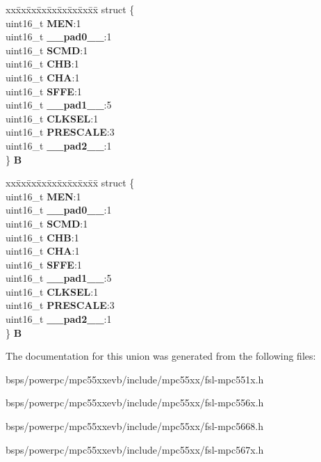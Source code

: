\begin{DoxyCompactItemize}
\begin{tabbing}
\end{tabbing}\item 
\mbox{\label{unionuMCR_a4d56113aeff75e361d6a373b9f5584f4}} 
\begin{tabbing}
xx\=xx\=xx\=xx\=xx\=xx\=xx\=xx\=xx\=\kill
struct \{\\
\>uint16\_t {\bfseries MEN}:1\\
\>uint16\_t {\bfseries \_\_pad0\_\_}:1\\
\>uint16\_t {\bfseries SCMD}:1\\
\>uint16\_t {\bfseries CHB}:1\\
\>uint16\_t {\bfseries CHA}:1\\
\>uint16\_t {\bfseries SFFE}:1\\
\>uint16\_t {\bfseries \_\_pad1\_\_}:5\\
\>uint16\_t {\bfseries CLKSEL}:1\\
\>uint16\_t {\bfseries PRESCALE}:3\\
\>uint16\_t {\bfseries \_\_pad2\_\_}:1\\
\} {\bfseries B}\\

\end{tabbing}\item 
\mbox{\label{unionuMCR_ae1cef2c7bb98b1f2e81a18f802158b13}} 
\begin{tabbing}
xx\=xx\=xx\=xx\=xx\=xx\=xx\=xx\=xx\=\kill
struct \{\\
\>uint16\_t {\bfseries MEN}:1\\
\>uint16\_t {\bfseries \_\_pad0\_\_}:1\\
\>uint16\_t {\bfseries SCMD}:1\\
\>uint16\_t {\bfseries CHB}:1\\
\>uint16\_t {\bfseries CHA}:1\\
\>uint16\_t {\bfseries SFFE}:1\\
\>uint16\_t {\bfseries \_\_pad1\_\_}:5\\
\>uint16\_t {\bfseries CLKSEL}:1\\
\>uint16\_t {\bfseries PRESCALE}:3\\
\>uint16\_t {\bfseries \_\_pad2\_\_}:1\\
\} {\bfseries B}\\

\end{tabbing}\end{DoxyCompactItemize}


The documentation for this union was generated from the following files\+:\begin{DoxyCompactItemize}
\item 
bsps/powerpc/mpc55xxevb/include/mpc55xx/fsl-\/mpc551x.\+h\item 
bsps/powerpc/mpc55xxevb/include/mpc55xx/fsl-\/mpc556x.\+h\item 
bsps/powerpc/mpc55xxevb/include/mpc55xx/fsl-\/mpc5668.\+h\item 
bsps/powerpc/mpc55xxevb/include/mpc55xx/fsl-\/mpc567x.\+h\end{DoxyCompactItemize}
